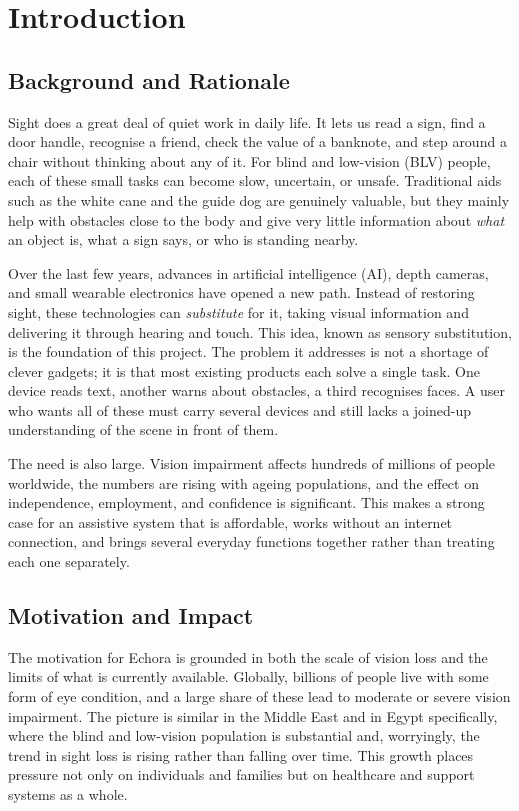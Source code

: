 \chapter{Introduction}
\label{ch:intro}

\section{Background and Rationale}

Sight does a great deal of quiet work in daily life. It lets us read a sign, find a door handle, recognise a friend, check the value of a banknote, and step around a chair without thinking about any of it. For blind and low-vision (BLV) people, each of these small tasks can become slow, uncertain, or unsafe. Traditional aids such as the white cane and the guide dog are genuinely valuable, but they mainly help with obstacles close to the body and give very little information about \emph{what} an object is, what a sign says, or who is standing nearby.

Over the last few years, advances in artificial intelligence (AI), depth cameras, and small wearable electronics have opened a new path. Instead of restoring sight, these technologies can \emph{substitute} for it, taking visual information and delivering it through hearing and touch. This idea, known as sensory substitution, is the foundation of this project. The problem it addresses is not a shortage of clever gadgets; it is that most existing products each solve a single task. One device reads text, another warns about obstacles, a third recognises faces. A user who wants all of these must carry several devices and still lacks a joined-up understanding of the scene in front of them.

The need is also large. Vision impairment affects hundreds of millions of people worldwide, the numbers are rising with ageing populations, and the effect on independence, employment, and confidence is significant. This makes a strong case for an assistive system that is affordable, works without an internet connection, and brings several everyday functions together rather than treating each one separately.

\section{Motivation and Impact}

The motivation for Echora is grounded in both the scale of vision loss and the limits of what is currently available. Globally, billions of people live with some form of eye condition, and a large share of these lead to moderate or severe vision impairment. The picture is similar in the Middle East and in Egypt specifically, where the blind and low-vision population is substantial and, worryingly, the trend in sight loss is rising rather than falling over time. This growth places pressure not only on individuals and families but on healthcare and support systems as a whole.

